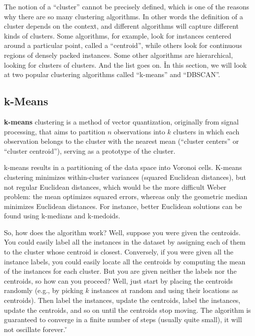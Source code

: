 The notion of a ``cluster'' cannot be precisely defined, which is one of the reasons why there are so many clustering
algorithms. In other words the definition of a cluster depends on the context, and different algorithms will capture
different kinds of clusters. Some algorithms, for example, look for instances centered around a particular point, 
called a ``centroid'', while others look for continuous regions of densely packed instances. Some other algorithms are
hierarchical, looking for clusters of clusters. And the list goes on. \v

In this section, we will look at two popular clustering algorithms called ``k-means'' and ``DBSCAN''.

\subsection{k-Means}

\bd[k-Means]
\textbf{k-means} clustering is a method of vector quantization, originally from signal processing, that aims to 
partition $n$ observations into $k$ clusters in which each observation belongs to the cluster with the nearest mean 
(``cluster centers'' or ``cluster centroid''), serving as a prototype of the cluster.
\ed

k-means results in a partitioning of the data space into Voronoi cells. K-means clustering minimizes within-cluster
variances (squared Euclidean distances), but not regular Euclidean distances, which would be the more difficult 
Weber problem: the mean optimizes squared errors, whereas only the geometric median minimizes Euclidean distances. 
For instance, better Euclidean solutions can be found using k-medians and k-medoids.


So, how does the algorithm work? Well, suppose you were given the centroids. You could easily label all the 
instances in the dataset by assigning each of them to the cluster whose centroid is closest. Conversely, if you were
given all the instance labels, you could easily locate all the centroids by computing the mean of the instances for 
each cluster. But you are given neither the labels nor the centroids, so how can you proceed? Well, just start by 
placing the centroids randomly (e.g., by picking $k$ instances at random and using their locations as centroids). 
Then label the instances, update the centroids, label the instances, update the centroids, and so on until the 
centroids stop moving. The algorithm is guaranteed to converge in a finite number of steps (usually quite small), it 
will not oscillate forever. \v

